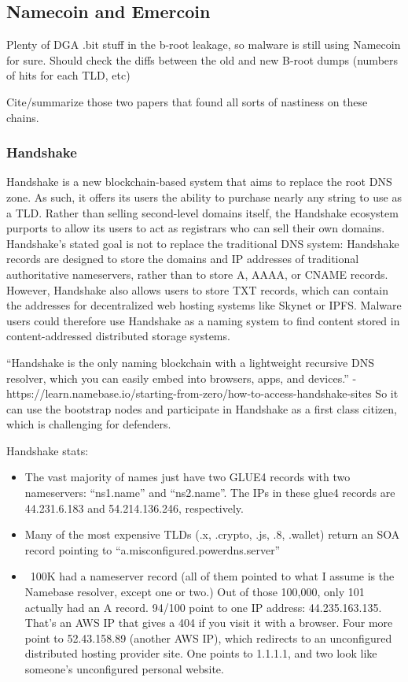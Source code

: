 \documentclass[10pt,sigconf,letterpaper]{acmart}
\begin{document}
\subsection{Namecoin and Emercoin}

Plenty of DGA .bit stuff in the b-root leakage, so malware is 
still using Namecoin for sure. Should check the diffs between 
the old and new B-root dumps (numbers of hits for each TLD, 
etc)

Cite/summarize those two papers that found all sorts of 
nastiness on these chains.

\subsubsection{Handshake}

Handshake is a new blockchain-based system that aims to 
replace the root DNS 
zone. As such, it offers its users the ability to purchase 
nearly any string to 
use as a TLD. Rather than selling second-level domains 
itself, the Handshake ecosystem purports to allow its users 
to act as registrars who can sell their own domains. 
Handshake's stated goal is not to replace the traditional DNS 
system: Handshake records are designed to store the domains 
and IP addresses of traditional authoritative nameservers, 
rather than to store A, AAAA, or CNAME records. However, 
Handshake also allows users to store TXT records, which can 
contain the addresses for decentralized web hosting systems 
like Skynet or IPFS. Malware users could therefore use 
Handshake as a naming system to find content stored in 
content-addressed distributed storage systems.

``Handshake is the only naming blockchain with a lightweight 
recursive DNS resolver, which you can easily embed into 
browsers, apps, and devices.'' - 
https://learn.namebase.io/starting-from-zero/how-to-access-handshake-sites
So it can use the bootstrap nodes and participate in 
Handshake as a first class citizen, which is challenging for 
defenders.

Handshake stats:
\begin{itemize}
	\item The vast majority of names just have two GLUE4 
	records with two nameservers: “ns1.name” and “ns2.name”. 
	The IPs in these glue4 records are 44.231.6.183 and 
	54.214.136.246, respectively.
	\item Many of the most expensive TLDs (.x, .crypto, .js, 
	.8, .wallet) return an SOA record pointing to 
	``a.misconfigured.powerdns.server''
	\item ~100K had a nameserver record (all of them pointed 
	to what I assume is the Namebase resolver, except one or 
	two.) Out of those 100,000, only 101 actually had an A 
	record. 94/100 point to one IP address: 44.235.163.135. 
	That's an AWS IP that gives a 404 if you visit it with a 
	browser. Four more point to 52.43.158.89 (another AWS 
	IP), which redirects to an unconfigured distributed 
	hosting provider site. One points to 1.1.1.1, and two 
	look like someone's unconfigured personal website.
\end{itemize}
\end{document}
